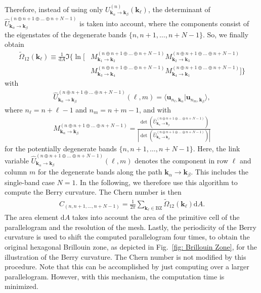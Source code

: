 Therefore, instead of using only $U^{(n)}_{\mathbf{k}_\alpha\to\mathbf{k}_\beta}(\mathbf{k}_\ell)$, the determinant of $\hat{U}_{\mathbf{k}_\alpha \to \mathbf{k}_\beta}^{(n \oplus n+1\oplus \dots\oplus n+N-1)}$ is taken into account, where the components consist of the eigenstates of the degenerate bands $\{n, n+1, \dots, n+N-1\}$. So, we finally obtain
\begin{align}
        \tilde{\Omega}_{12}(\mathbf{k}_\ell) \equiv  \frac{1}{\text{d}A} 
        \Im \Bigg\{\ln \Big[  &M_{\mathbf{k}_1 \to \mathbf{k}_2}^{(n\oplus n+1 \oplus \dots \oplus n+N-1)} M_{\mathbf{k}_2 \to \mathbf{k}_3}^{(n\oplus n+1 \oplus \dots \oplus n+N-1)} \nonumber \\
        &M_{\mathbf{k}_3 \to \mathbf{k}_4}^{(n\oplus n+1 \oplus \dots \oplus n+N-1)} M_{\mathbf{k}_4 \to \mathbf{k}_1}^{(n\oplus n+1 \oplus \dots \oplus n+N-1)}  \Big] \Bigg\}
    \label{eq: berry curv comp}
\end{align}
with 
\begin{align}
    \hat{U}_{\mathbf{k}_\alpha \to \mathbf{k}_\beta}^{(n\oplus n+1 \oplus \dots \oplus n+N-1)}(\ell, m) = {\langle \mathbf{u}_{n_\ell,\mathbf{k}_\alpha}| \mathbf{u}_{n_m,\mathbf{k}_\beta}\rangle},
\end{align}
where $n_\ell = n+\ell-1$ and $n_m=n+m-1$, and with
\begin{align} 
    M_{\mathbf{k}_\alpha \to \mathbf{k}_\beta}^{(n\oplus n+1 \oplus \dots \oplus n+N-1)} =  \frac{\det \left(\hat{U}_{\mathbf{k}_\alpha \to \mathbf{k}_\beta}^{(n\oplus n+1 \oplus \dots \oplus n+N-1)} \right)}{\left|\det \left(\hat{U}_{\mathbf{k}_\alpha \to \mathbf{k}_\beta}^{(n\oplus n+1 \oplus \dots \oplus n+N-1)} \right)\right|}
\end{align}
for the potentially degenerate bands $\{n, n+1, \dots, n+N-1\}$. Here, the link variable $\hat{U}_{\mathbf{k}_\alpha \to \mathbf{k}_\beta}^{(n\oplus n+1 \oplus \dots \oplus n+N-1)}(\ell,m)$ denotes the component in row $\ell$ and column $m$ for the degenerate bands along the path $\mathbf{k}_\alpha \to \mathbf{k}_\beta$. 
This includes the single-band case $N=1$. In the following, we therefore use this algorithm to compute the Berry curvature. The Chern number is then
\begin{align}
    C_{(n,n+1,\dots,n+N-1)}= \frac{1}{2\pi}\sum_{\mathbf{k}_\ell \in\text{BZ}} \tilde{\Omega}_{12}(\mathbf{k}_\ell)\text{d}A .
\end{align}
The area element $\text{d}A$ takes into account the area of the primitive cell of the parallelogram and the resolution of the mesh. Lastly, the periodicity of the Berry curvature is used to shift the computed parallelogram four times, to obtain the original hexagonal Brillouin zone, as depicted in Fig.~\ref{fig: Brillouin Zone}, for the illustration of the Berry curvature. The Chern number is not modified by this procedure. 
Note that this can be accomplished by just computing over a larger parallelogram. However, with this mechanism, the computation time is minimized.


